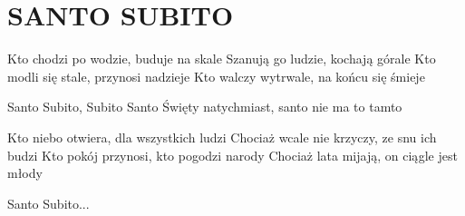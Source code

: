 \documentclass[../../../songbook.tex]{subfiles}
\begin{document}
\TabPositions{8cm} %
\section*{SANTO SUBITO}
{}
\vspace{0.5cm}
Kto chodzi po wodzie, buduje na skale	 \newline	
Szanują go ludzie, kochają górale \newline
Kto modli się stale, przynosi nadzieje \newline
Kto walczy wytrwale, na końcu się śmieje \newline

\-\hspace{1cm} Santo Subito, Subito Santo \newline
\-\hspace{1cm} Święty natychmiast, santo nie ma to tamto \newline

Kto niebo otwiera, dla wszystkich ludzi \newline
Chociaż wcale nie krzyczy, ze snu ich budzi \newline
Kto pokój przynosi, kto pogodzi narody \newline
Chociaż lata mijają, on ciągle jest młody \newline

\-\hspace{1cm} Santo Subito... \newline
\end{document}
